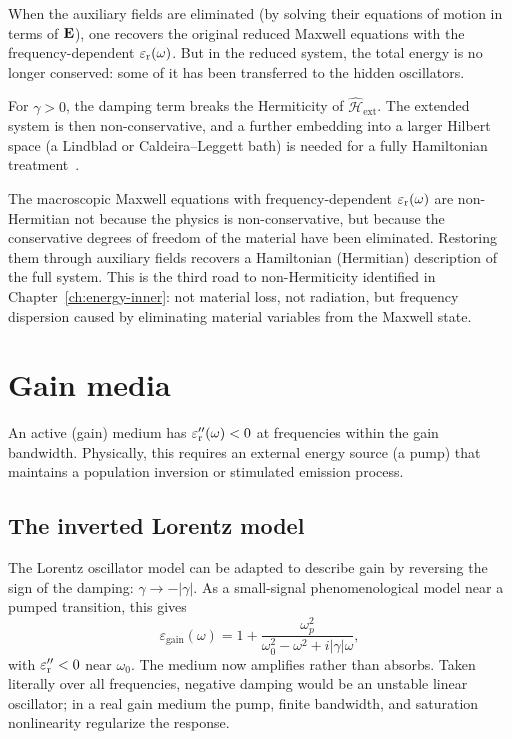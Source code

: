 When the auxiliary fields are eliminated (by solving their equations of
motion in terms of $\mathbf{E}$), one recovers the original reduced Maxwell
equations with the frequency-dependent $\varepsilon_{\mathrm{r}}(\omega)$. But in the
reduced system, the total energy is no longer conserved: some of it has
been transferred to the hidden oscillators.

For $\gamma > 0$, the damping term breaks the Hermiticity of
$\hat{\mathcal{H}}_{\mathrm{ext}}$. The extended system is then
non-conservative, and a further embedding into a larger Hilbert space
(a Lindblad or Caldeira--Leggett bath) is needed for a fully Hamiltonian
treatment~\cite{figotin2004hamiltonian}.

\begin{takeaway}
The macroscopic Maxwell equations with frequency-dependent $\varepsilon_{\mathrm{r}}(\omega)$
are non-Hermitian not because the physics is non-conservative, but because
the conservative degrees of freedom of the material have been eliminated.
Restoring them through auxiliary fields recovers a Hamiltonian (Hermitian)
description of the full system. This is the third road to non-Hermiticity
identified in Chapter~\ref{ch:energy-inner}: not material loss, not
radiation, but frequency dispersion caused by eliminating material
variables from the Maxwell state.
\end{takeaway}


\section{Gain media}
\label{sec:gain-media}

An active (gain) medium has $\varepsilon_{\mathrm{r}}''(\omega) < 0$ at frequencies within
the gain bandwidth. Physically, this requires an external energy source
(a pump) that maintains a population inversion or stimulated emission
process.

\subsection{The inverted Lorentz model}
\label{ssec:inverted-lorentz}

The Lorentz oscillator model can be adapted to describe gain by reversing
the sign of the damping: $\gamma \to -|\gamma|$. As a small-signal
phenomenological model near a pumped transition, this gives
\begin{equation}
 \varepsilon_{\mathrm{gain}}(\omega)
 = 1 + \frac{\omega_p^2}
 {\omega_0^2 - \omega^2 + i|\gamma|\omega},
 \label{eq:gain-eps}
\end{equation}
with $\varepsilon_{\mathrm{r}}'' < 0$ near $\omega_0$. The medium now amplifies rather than
absorbs. Taken literally over all frequencies, negative damping would be
an unstable linear oscillator; in a real gain medium the pump, finite
bandwidth, and saturation nonlinearity regularize the response.

